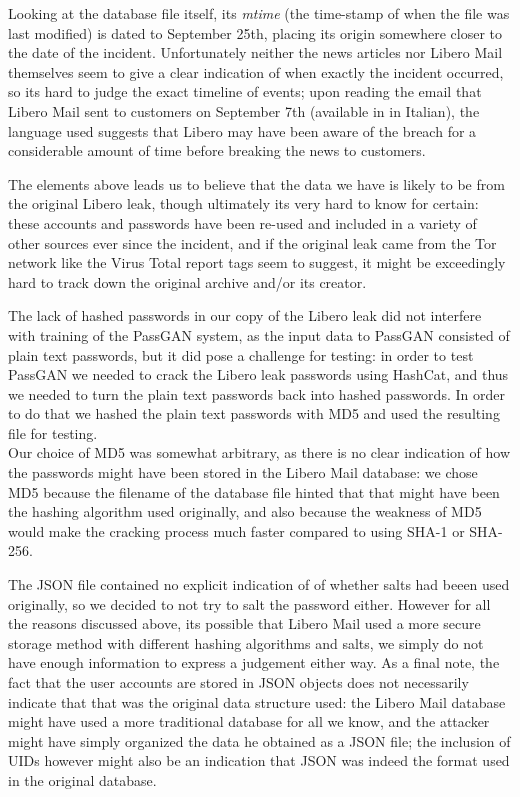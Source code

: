 Looking at the database file itself, its \emph{mtime} (the time-stamp of when the file was last modified) is dated to September 25th, placing its origin somewhere closer to the date of the incident. 
\clearpage
Unfortunately neither the news articles nor Libero Mail themselves seem to give a clear indication of when exactly the incident occurred, so its hard to judge the exact timeline of events; upon reading the email that Libero Mail sent to customers on September 7th (available in \cite{libero-news-fanpage} in Italian), the language used suggests that Libero may have been aware of the breach for a considerable amount of time before breaking the news to customers.

The elements above leads us to believe that the data we have is likely to be from the original Libero leak, though ultimately its very hard to know for certain: these accounts and passwords have been re-used and included in a variety of other sources ever since the incident, and if the original leak came from the Tor network like the Virus Total report tags seem to suggest, it might be exceedingly hard to track down the original archive and/or its creator.

The lack of hashed passwords in our copy of the Libero leak did not interfere with training of the PassGAN system, as the input data to PassGAN consisted of plain text passwords, but it did pose a challenge for testing: in order to test PassGAN we needed to crack the Libero leak passwords using HashCat, and thus we needed to turn the plain text passwords back into hashed passwords.
In order to do that we hashed the plain text passwords with MD5 and used the resulting file for testing.\\
Our choice of MD5 was somewhat arbitrary, as there is no clear indication of how the passwords might have been stored in the Libero Mail database: we chose MD5 because the filename of the database file hinted that that might have been the hashing algorithm used originally, and also because the weakness of MD5 would make the cracking process much faster compared to using SHA-1 or SHA-256. 

The JSON file contained no explicit indication of of whether salts had beeen used originally, so we decided to not try to salt the password either. 
However for all the reasons discussed above, its possible that Libero Mail used a more secure storage method with different hashing algorithms and salts, we simply do not have enough information to express a judgement either way.
As a final note, the fact that the user accounts are stored in JSON objects does not necessarily indicate that that was the original data structure used: the Libero Mail database might have used a more traditional database for all we know, and the attacker might have simply organized the data he obtained as a JSON file; the inclusion of UIDs however might also be an indication that JSON was indeed the format used in the original database.

